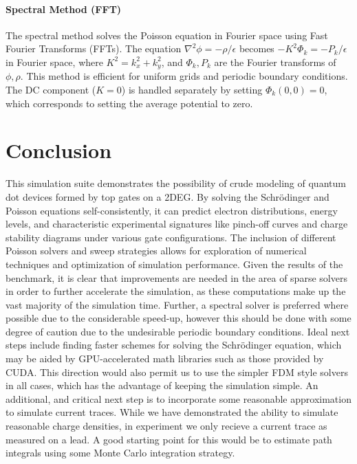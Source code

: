 \documentclass{article}
\begin{document}
\paragraph{Spectral Method (FFT)}
The spectral method solves the Poisson equation in Fourier space using Fast Fourier Transforms (FFTs). The equation \(\nabla^2 \phi = -\rho/\epsilon\) becomes \(-K^2 \Phi_k = -P_k/\epsilon\) in Fourier space, where \(K^2 = k_x^2 + k_y^2\), and \(\Phi_k, P_k\) are the Fourier transforms of \(\phi, \rho\). This method is efficient for uniform grids and periodic boundary conditions. The DC component (\(K=0\)) is handled separately by setting \(\Phi_k(0,0)=0\), which corresponds to setting the average potential to zero.

\section{Conclusion}
This simulation suite demonstrates the possibility of crude modeling of quantum dot devices formed by top gates on a 2DEG. By solving the Schrödinger and Poisson equations self-consistently, it can predict electron distributions, energy levels, and characteristic experimental signatures like pinch-off curves and charge stability diagrams under various gate configurations. The inclusion of different Poisson solvers and sweep strategies allows for exploration of numerical techniques and optimization of simulation performance. Given the results of the benchmark, it is clear that improvements are needed in the area of sparse solvers in order to further accelerate the simulation, as these computations make up the vast majority of the simulation time. Further, a spectral solver is preferred where possible due to the considerable speed-up, however this should be done with some degree of caution due to the undesirable periodic boundary conditions. Ideal next steps include finding faster schemes for solving the Schrödinger equation, which may be aided by GPU-accelerated math libraries such as those provided by CUDA. This direction would also permit us to use the simpler FDM style solvers in all cases, which has the advantage of keeping the simulation simple. An additional, and critical next step is to incorporate some reasonable approximation to simulate current traces. While we have demonstrated the ability to simulate reasonable charge densities, in experiment we only recieve a current trace as measured on a lead. A good starting point for this would be to estimate path integrals using some Monte Carlo integration strategy.

\newpage
\end{document}
